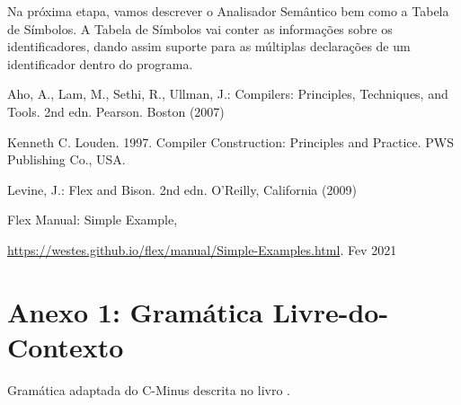 \documentclass[runningheads]{llncs}
\begin{document}
Na próxima etapa, vamos descrever o Analisador Semântico bem como a Tabela de Símbolos.
A Tabela de Símbolos vai conter as informações sobre os identificadores, dando assim suporte para as múltiplas declarações de um identificador dentro do programa.

%
%

%
%
%


%
\begin{thebibliography}{8}


Aho, A., Lam, M., Sethi, R., Ullman, J.: Compilers: Principles, Techniques, and Tools. 2nd edn. Pearson.
Boston (2007)

Kenneth C. Louden. 1997. Compiler Construction: Principles and Practice. PWS Publishing Co., USA.

Levine, J.: Flex and Bison. 2nd edn. O'Reilly,
California (2009)

Flex Manual: Simple Example,

\url{https://westes.github.io/flex/manual/Simple-Examples.html}. Fev 2021


\end{thebibliography}

\newpage
\section{Anexo 1: Gramática Livre-do-Contexto}

Gramática adaptada do C-Minus descrita no livro \cite{compilers_book2} .

\newcommand{\size}[2]{{\fontsize{#1}{0}\selectfont#2}}
\newenvironment{sizepar}[2]
 {\par\fontsize{#1}{#2}\selectfont}
 {\par}
 
\end{document}
